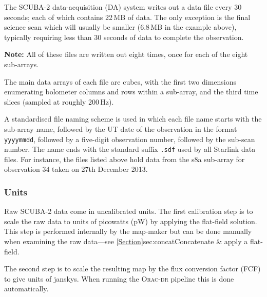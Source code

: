 The SCUBA-2 data-acquisition (DA) system writes out a data file every
30 seconds; each of which contains 22\,MB of data. The only exception
is the final science scan which will usually be smaller (6.8\,MB in
the example above), typically requiring less than 30 seconds of data
to complete the observation.

\textbf{Note:} All of these files are written out eight times, once
for each of the eight sub-arrays.

The main data arrays of each file are cubes, with the first two
dimensions enumerating bolometer columns and rows within a sub-array,
and the third time slices (sampled at roughly 200\,Hz).

A standardised file naming scheme is used in which each file name starts
with the sub-array name, followed by the UT date of the observation in
the format \texttt{yyyymmdd}, followed by a five-digit observation
number, followed by the sub-scan number. The name ends with the standard
suffix \texttt{.sdf} used by all Starlink data files. For instance, the files
listed above hold data from the s8a sub-array for observation 34 taken on
27th December 2013.

\subsubsection*{Units}

Raw SCUBA-2 data come in uncalibrated units. The first calibration
step is to scale the raw data to units of picowatts (pW)
by applying the flat-field solution. This step is performed internally
by the map-maker but can be done manually when examining the raw
data---see \cref{Section}{sec:concat}{Concatenate \& apply a
  flat-field}.

The second step is to scale the resulting map by the flux conversion factor
(FCF) to give units of janskys. When running the
\textsc{Orac-dr} pipeline this is done automatically.



